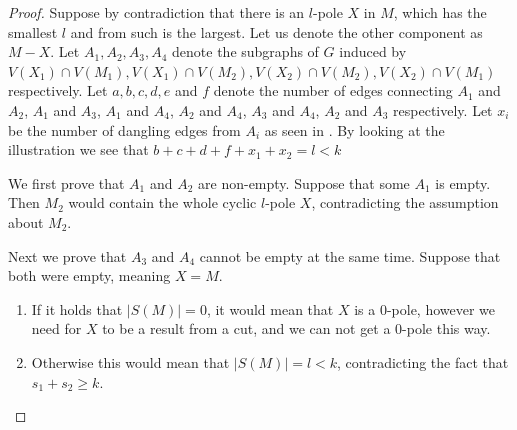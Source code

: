 \documentclass[12pt, twoside]{book}
\begin{document}
\begin{proof}
	Suppose by contradiction that there is an $l$-pole $X$ in $M$, which has the smallest $l$ and from such is the largest. Let us denote the other component as $M-X$. Let $A_1,A_2,A_3,A_4$ denote the subgraphs of $G$ induced by $V(X_1)\cap V(M_1), V(X_1)\cap V(M_2), V(X_2)\cap V(M_2), V(X_2)\cap V(M_1)$ respectively. Let $a,b,c,d,e$ and $f$ denote the number of edges connecting $A_1$ and $A_2$, $A_1$ and $A_3$, $A_1$ and $A_4$, $A_2$ and $A_4$, $A_3$ and $A_4$, $A_2$ and $A_3$ respectively. Let $x_i$ be the number of dangling edges from $A_i$ as seen in . By looking at the illustration we see that $b+c+d+f+x_1+x_2=l<k$
	
	We first prove that $A_1$ and $A_2$ are non-empty. Suppose that some $A_1$ is empty. Then $M_2$ would contain the whole cyclic $l$-pole $X$, contradicting the assumption about $M_2$.
	
	Next we prove that $A_3$ and $A_4$ cannot be empty at the same time. Suppose that both were empty, meaning $X=M$.
	\begin{enumerate}
		\item If it holds that $|S(M)|=0$, it would mean that $X$ is a 0-pole, however we need for $X$ to be a result from a cut, and we can not get a 0-pole this way.
		\item Otherwise this would mean that $|S(M)|=l<k$, contradicting the fact that $s_1+s_2\geq k$.
	\end{enumerate}

	

\end{proof}
\end{document}

